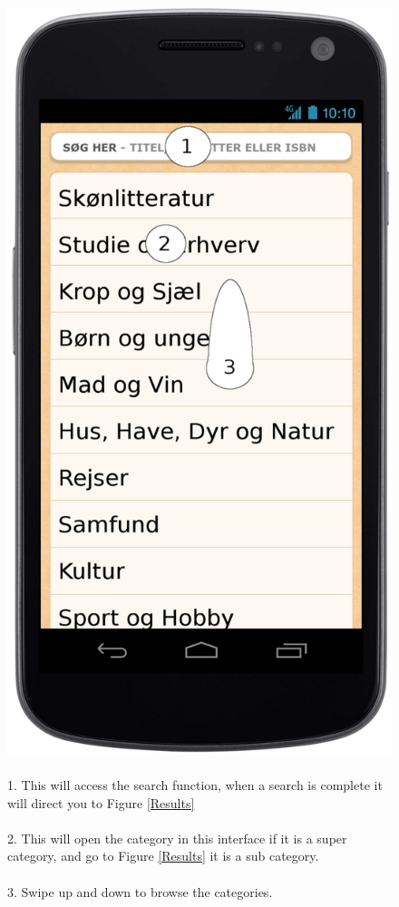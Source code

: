 \documentclass[12pt]{article}
\begin{document}
\begin{figure}
\includegraphics[scale=0.7]{gnexsoegeogbrowse.png}
\caption{
\\
1. This will access the search function, when a search is complete it will direct you to Figure \ref{Results}\\\\
2. This will open the category in this interface if it is a super category, and go to Figure \ref{Results} it is a sub category.\\\\
3. Swipe up and down to browse the categories.
}
\label{Categories}
\end{figure}
\end{document}
